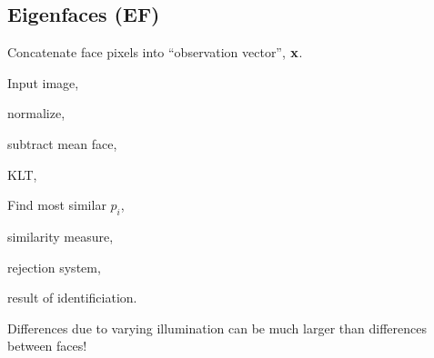 \begin{compactdesc}
	\section{Eigenfaces (EF)}
	Concatenate face pixels into ``observation vector'', $\boldsymbol{\mathrm{x}}$.
\item[\lp{EI for recognition}]
	\begin{inparaenum}[\itshape(1)]
		\item Input image,
		\item normalize,
		\item subtract mean face,
		\item KLT,
		\item Find most similar $p_i$,
		\item similarity measure,
		\item rejection system,
		\item result of identificiation.
	\end{inparaenum}
\item[\lp{Limitations of EFs}] Differences due to varying illumination can be much larger than differences between faces!

\end{compactdesc}

